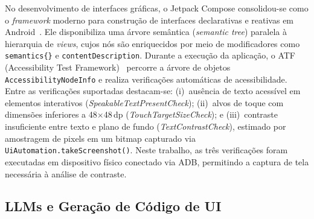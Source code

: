\documentclass[sigconf,anonymous,review]{webmedia}
\begin{document}
No desenvolvimento de interfaces gráficas, o Jetpack Compose
consolidou-se como o \textit{framework} moderno para construção de
interfaces declarativas e reativas em Android~\cite{google2024compose}.
Ele disponibiliza uma árvore semântica (\textit{semantic tree})
paralela à hierarquia de \textit{views}, cujos nós são enriquecidos
por meio de modificadores como \texttt{semantics\{\}} e
\texttt{contentDescription}. Durante a execução da aplicação, o ATF
(Accessibility Test Framework)~\cite{google2024atf} percorre a árvore
de objetos \texttt{AccessibilityNodeInfo} e realiza verificações
automáticas de acessibilidade. Entre as verificações suportadas
destacam-se: (i)~ausência de texto acessível em elementos interativos
(\textit{SpeakableTextPresentCheck}); (ii)~alvos de toque com
dimensões inferiores a 48$\times$48\,dp (\textit{TouchTargetSizeCheck});
e (iii)~contraste insuficiente entre texto e plano de fundo
(\textit{TextContrastCheck}), estimado por amostragem de pixels em um
bitmap capturado via \texttt{UiAutomation.takeScreenshot()}.
Neste trabalho, as três verificações foram executadas em dispositivo
físico conectado via ADB, permitindo a captura de tela necessária à
análise de contraste.

\subsection{LLMs e Geração de Código de UI}
\end{document}
